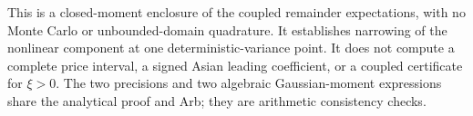 This is a closed-moment enclosure of the coupled remainder expectations,
with no Monte Carlo or unbounded-domain quadrature. It establishes narrowing
of the nonlinear component at one deterministic-variance point. It does not
compute a complete price interval, a signed Asian leading coefficient, or a
coupled certificate for \(\xi>0\). The two precisions and two algebraic
Gaussian-moment expressions share the analytical proof and Arb; they are
arithmetic consistency checks.
